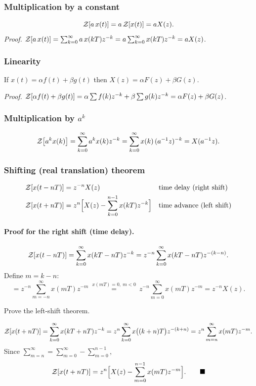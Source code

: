 \subsubsection*{Multiplication by a constant}
\[
  \mathcal{Z}\!\left[a\,x(t)\right]=a\,\mathcal{Z}\!\left[x(t)\right]=aX(z).
\]
\emph{Proof.} $\mathcal{Z}\!\left[a\,x(t)\right]=\sum_{k=0}^{\infty}a\,x(kT)z^{-k}=a\sum_{k=0}^{\infty}x(kT)z^{-k}=aX(z)$.

\subsubsection*{Linearity}
If $x(t)=\alpha f(t)+\beta g(t)$ then $X(z)=\alpha F(z)+\beta G(z)$.

\emph{Proof.} $\mathcal{Z}\!\left[\alpha f(t)+\beta g(t)\right]=\alpha\sum f(k)z^{-k}+\beta\sum g(k)z^{-k}=\alpha F(z)+\beta G(z)$.

\subsubsection*{Multiplication by $a^{k}$}
\[
  \mathcal{Z}\!\left[a^{k}x(k)\right]=\sum_{k=0}^{\infty}a^{k}x(k)z^{-k}=\sum_{k=0}^{\infty}x(k)\,(a^{-1}z)^{-k}=X(a^{-1}z).
\]

\subsubsection*{Shifting (real translation) theorem}
\begin{align}
  \mathcal{Z}\!\left[x(t-nT)\right]&=z^{-n}X(z) && \text{time delay (right shift)}\\
  \mathcal{Z}\!\left[x(t+nT)\right]&=z^{n}\Bigl[X(z)-\sum_{k=0}^{n-1}x(kT)z^{-k}\Bigr] && \text{time advance (left shift)}
\end{align}

\paragraph{Proof for the right shift (time delay).}
\[
  \mathcal{Z}\!\left[x(t-nT)\right]=\sum_{k=0}^{\infty}x(kT-nT)z^{-k}=z^{-n}\sum_{k=0}^{\infty}x(kT-nT)z^{-(k-n)} .
\]
Define $m=k-n$:
\[
  =z^{-n}\sum_{m=-n}^{\infty}x(mT)z^{-m}\ \overset{x(mT)=0,\ m<0}{=}\ z^{-n}\sum_{m=0}^{\infty}x(mT)z^{-m}=z^{-n}X(z).
\]

\begin{bexercise}
Prove the left-shift theorem.
\end{bexercise}
\begin{addsol}
\[
  \mathcal{Z}\!\left[x(t+nT)\right]=\sum_{k=0}^{\infty}x(kT+nT)z^{-k}=z^{n}\sum_{k=0}^{\infty}x\bigl((k+n)T\bigr)z^{-(k+n)}
  =z^{n}\sum_{m=n}^{\infty}x(mT)z^{-m}.
\]
Since $\sum_{m=n}^{\infty}=\sum_{m=0}^{\infty}-\sum_{m=0}^{n-1}$,
\[
  \mathcal{Z}\!\left[x(t+nT)\right]=z^{n}\Bigl[X(z)-\sum_{m=0}^{n-1}x(mT)z^{-m}\Bigr].\qquad\blacksquare
\]
\end{addsol}

